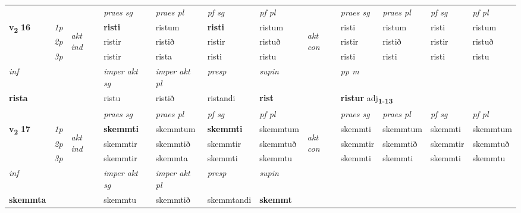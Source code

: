 \begin{longtable}[l]{X>{\footnotesize\itshape}llXXXXlXXXX}
 & &   & \textit{praes sg}  & \textit{praes pl}    & \textit{ pf sg} & \textit{pf pl} & & \textit{praes sg}  & \textit{praes pl}    & \textit{pf sg} & \textit{pf pl }  \\ \cmidrule{4-7} \cmidrule{9-12}
 \multirow{2}{*}{{{\textbf{v{\textsubscript{2}}} \Large{\textbf{16}}}}}  & 1p & \multirow{3}{*}{\begin{turn}{90}\textit{akt ind}\end{turn}} & \textbf{risti} & ristum & \textbf{risti} & ristum & \multirow{3}{*}{\begin{turn}{90}\textit{akt con}\end{turn}} &risti & ristum & risti & ristum\\*
 & 2p &  &  ristir  & ristið & ristir & ristuð & & ristir & ristið & ristir & ristuð \\*
 & 3p &  & ristir & rista & risti & ristu & & risti & risti& risti & ristu \\*
\cmidrule{4-7} \cmidrule{9-12}

   {\textit{inf}} & &  & \textit{imper akt sg} & \textit{imper akt pl}   & \textit{presp} & \textit{supin}  && \textit{pp m} \\*
  {\textbf{rista}} & && ristu  & ristið   & ristandi &  \textbf{rist}  && \multicolumn{2}{l}{\textbf{ristur} adj\textbf{\textsubscript{1-13}}} \\*

\midrule

 & &   & \textit{praes sg}  & \textit{praes pl}    & \textit{ pf sg} & \textit{pf pl} & & \textit{praes sg}  & \textit{praes pl}    & \textit{pf sg} & \textit{pf pl }  \\ \cmidrule{4-7} \cmidrule{9-12}
 \multirow{2}{*}{{{\textbf{v{\textsubscript{2}}} \Large{\textbf{17}}}}}  & 1p & \multirow{3}{*}{\begin{turn}{90}\textit{akt ind}\end{turn}} & \textbf{skemmti} & skemmtum & \textbf{skemmti} & skemmtum & \multirow{3}{*}{\begin{turn}{90}\textit{akt con}\end{turn}} &skemmti & skemmtum & skemmti & skemmtum\\*
 & 2p &  &  skemmtir  & skemmtið & skemmtir & skemmtuð & & skemmtir & skemmtið & skemmtir & skemmtuð \\*
 & 3p &  & skemmtir & skemmta & skemmti & skemmtu & & skemmti & skemmti& skemmti & skemmtu \\*
\cmidrule{4-7} \cmidrule{9-12}

   {\textit{inf}} & &  & \textit{imper akt sg} & \textit{imper akt pl}   & \textit{presp} & \textit{supin}   \\*
  {\textbf{skemmta}} & && skemmtu  & skemmtið   & skemmtandi &  \textbf{skemmt}   \\*


\end{longtable}

